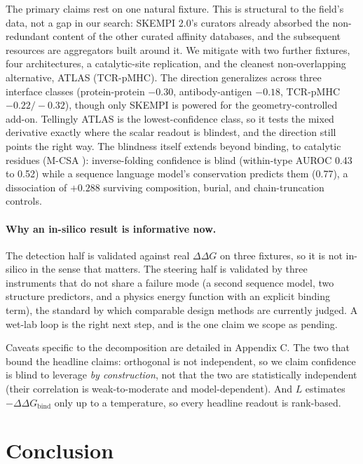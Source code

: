 \documentclass{article} %
\begin{document}
The primary claims rest on one natural fixture. This is structural to the field's data, not a gap in our search:
SKEMPI 2.0's curators already absorbed the non-redundant content of the other curated affinity databases, and the
subsequent resources are aggregators built around it. We mitigate with two further fixtures, four architectures, a
catalytic-site replication, and the cleanest non-overlapping alternative, ATLAS \citep{borrman2017atlas}
(TCR-pMHC). The direction generalizes across three interface classes (protein-protein $-0.30$, antibody-antigen
$-0.18$, TCR-pMHC $-0.22 / -0.32$), though only SKEMPI is powered for the geometry-controlled add-on. Tellingly
ATLAS is the lowest-confidence class, so it tests the mixed derivative exactly where the scalar readout is
blindest, and the direction still points the right way. The blindness itself extends beyond binding, to catalytic
residues (M-CSA \citep{ribeiro2018mcsa}): inverse-folding confidence is blind (within-type AUROC 0.43 to 0.52)
while a sequence language model's conservation predicts them (0.77), a dissociation of $+0.288$ surviving
composition, burial, and chain-truncation controls.

\paragraph{Why an in-silico result is informative now.} The detection half is validated against real $\Delta\Delta G$ on three
fixtures, so it is not in-silico in the sense that matters. The steering half is validated by three instruments
that do not share a failure mode (a second sequence model, two structure predictors, and a physics energy function
with an explicit binding term), the standard by which comparable design methods are currently judged. A wet-lab
loop is the right next step, and is the one claim we scope as pending.

Caveats specific to the decomposition are detailed in Appendix C. The two that bound the headline claims:
orthogonal is not independent, so we claim confidence is blind to leverage \emph{by construction}, not that the two
are statistically independent (their correlation is weak-to-moderate and model-dependent). And $L$ estimates
$-\Delta\Delta G_{\text{bind}}$ only up to a temperature, so every headline readout is rank-based.

\section{Conclusion}
\end{document}
